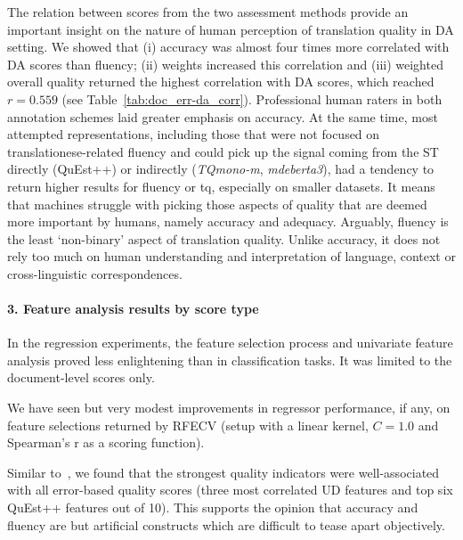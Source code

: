 The relation between scores from the two assessment methods provide an important insight on the nature of human perception of translation quality in DA setting. We showed that (i) accuracy was almost four times more correlated with DA scores than fluency; (ii) weights increased this correlation and (iii) weighted overall quality returned the highest correlation with DA scores, which reached $r=0.559$ (see Table~\ref{tab:doc_err-da_corr}). Professional human raters in both annotation schemes laid greater emphasis on accuracy. 
At the same time, most attempted representations, including those that were not focused on translationese-related fluency and could pick up the signal coming from the ST directly (QuEst++) or indirectly (\textit{TQmono-m}, \textit{mdeberta3}), had a tendency to return higher results for fluency or tq, especially on smaller datasets. It means that machines struggle with picking those aspects of quality that are deemed more important by humans, namely accuracy and adequacy. Arguably, fluency is the least `non-binary' aspect of translation quality. Unlike accuracy, it does not rely too much on human understanding and interpretation of language, context or cross-linguistic correspondences. 

\paragraph{3. Feature analysis results by score type}
In the regression experiments, the feature selection process and univariate feature analysis proved less enlightening than in classification tasks. It was limited to the document-level scores only.

We have seen but very modest improvements in regressor performance, if any, on feature selections returned by \gls{RFECV} (setup with a linear kernel, $C=1.0$ and Spearman's r as a scoring function).  

Similar to~\citet{Yuan2018}, we found that the strongest quality indicators were well-associated with all error-based quality scores (three most correlated UD features and top six QuEst++ features out of 10). 
This supports the opinion that accuracy and fluency are but artificial constructs which are difficult to tease apart objectively. %

